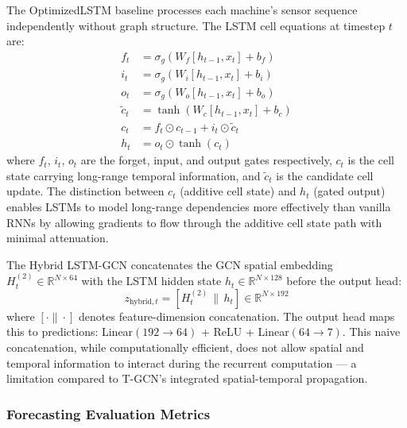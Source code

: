 The OptimizedLSTM baseline processes each machine's sensor sequence independently without graph structure. The LSTM cell equations at timestep $t$ are:
\begin{align}
    f_t &= \sigma_g(W_f [h_{t-1}, x_t] + b_f)  \label{eq:lstm_forget} \\
    i_t &= \sigma_g(W_i [h_{t-1}, x_t] + b_i)  \label{eq:lstm_input} \\
    o_t &= \sigma_g(W_o [h_{t-1}, x_t] + b_o)  \label{eq:lstm_output} \\
    \tilde{c}_t &= \tanh(W_c [h_{t-1}, x_t] + b_c)  \label{eq:lstm_candidate} \\
    c_t &= f_t \odot c_{t-1} + i_t \odot \tilde{c}_t  \label{eq:lstm_cell} \\
    h_t &= o_t \odot \tanh(c_t)  \label{eq:lstm_hidden}
\end{align}
where $f_t$, $i_t$, $o_t$ are the forget, input, and output gates respectively, $c_t$ is the cell state carrying long-range temporal information, and $\tilde{c}_t$ is the candidate cell update. The distinction between $c_t$ (additive cell state) and $h_t$ (gated output) enables LSTMs to model long-range dependencies more effectively than vanilla RNNs by allowing gradients to flow through the additive cell state path with minimal attenuation.

The Hybrid LSTM-GCN concatenates the GCN spatial embedding $H^{(2)}_t \in \mathbb{R}^{N \times 64}$ with the LSTM hidden state $h_t \in \mathbb{R}^{N \times 128}$ before the output head:
\begin{equation}
    z_{\text{hybrid},t} = [H^{(2)}_t \,\|\, h_t] \in \mathbb{R}^{N \times 192}
    \label{eq:hybrid}
\end{equation}
where $[\cdot \| \cdot]$ denotes feature-dimension concatenation. The output head maps this to predictions: Linear$(192 \to 64)$ + ReLU + Linear$(64 \to 7)$. This naive concatenation, while computationally efficient, does not allow spatial and temporal information to interact during the recurrent computation --- a limitation compared to T-GCN's integrated spatial-temporal propagation.

\subsubsection{Forecasting Evaluation Metrics}

